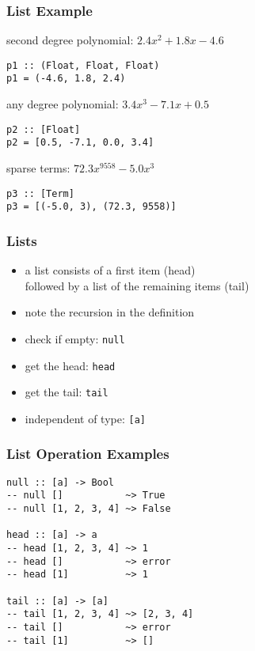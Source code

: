 \documentclass[dvipsnames]{beamer}
\theoremstyle{plain}
\begin{document}
\begin{frame}[fragile]
  \frametitle{List Example}

  \begin{exampleblock}{second degree polynomial: $2.4x^2 + 1.8x - 4.6$}
    \begin{lstlisting}
p1 :: (Float, Float, Float)
p1 = (-4.6, 1.8, 2.4)
    \end{lstlisting}
  \end{exampleblock}

  \begin{exampleblock}{any degree polynomial: $3.4x^3 - 7.1x + 0.5$}
    \begin{lstlisting}
p2 :: [Float]
p2 = [0.5, -7.1, 0.0, 3.4]
    \end{lstlisting}
  \end{exampleblock}

  \begin{exampleblock}{sparse terms: $72.3x^{9558} - 5.0x^3$}
    \begin{lstlisting}
p3 :: [Term]
p3 = [(-5.0, 3), (72.3, 9558)]
    \end{lstlisting}
  \end{exampleblock}
\end{frame}

\begin{frame}
  \frametitle{Lists}

  \begin{itemize}
    \item a list consists of a first item (\alert{head})\\
      followed by a list of the remaining items (\alert{tail})
    \item note the recursion in the definition

    \medskip
    \item check if empty: \lstinline|null|
    \item get the head: \lstinline|head|
    \item get the tail: \lstinline|tail|

    \pause
    \medskip
    \item independent of type: \lstinline|[a]|
  \end{itemize}
\end{frame}

\begin{frame}[fragile]
  \frametitle{List Operation Examples}

  \begin{lstlisting}
null :: [a] -> Bool
-- null []           ~> True
-- null [1, 2, 3, 4] ~> False

head :: [a] -> a
-- head [1, 2, 3, 4] ~> 1
-- head []           ~> error
-- head [1]          ~> 1

tail :: [a] -> [a]
-- tail [1, 2, 3, 4] ~> [2, 3, 4]
-- tail []           ~> error
-- tail [1]          ~> []
  \end{lstlisting}
\end{frame}
\end{document}
